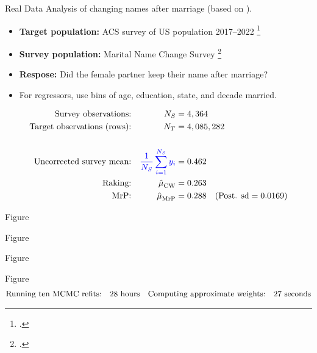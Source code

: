 
\begin{frame}{Real Data}
Analysis of changing names after marriage (based on \textcite{alexander:2019:namechange}).

\begin{itemize}
    \item \textbf{Target population:} ACS survey of US population 2017--2022 \footcite{ipumsusa}
    \item \textbf{Survey population:} Marital Name Change Survey \footcite{cohen:2019:namechange}
    \item \textbf{Respose:}  Did the female partner keep their name after marriage?
    \item For regressors, use bins of age, education, state, and decade married.
\end{itemize}

$$
\begin{aligned}
    \textrm{Survey observations:} &&  {N_S} ={}& 4,364  \\
    \textrm{Target observations (rows):} &&  {N_T} ={}& 4,085,282 \\
    \\
    \textrm{Uncorrected survey mean:} && \textcolor{blue}{\frac{1}{{N_S}} \sum_{i=1}^{N_S} y_i} ={}& 0.462 \\
    \textrm{Raking:} && \hat{\mu}^{}_{\mathrm{CW}} ={}& 0.263 \\
    \textrm{MrP:} && \hat{\mu}^{}_{\mathrm{MrP}} ={}& 0.288
        \quad(\textrm{Post. sd} = 0.0169)\\
\end{aligned}
$$
%
\end{frame}


\begin{frame}{Figure}
\AlexanderImbalancePrimary{}
\end{frame}


\begin{frame}{Figure}
\AlexanderImbalanceInteraction{}
\end{frame}




\begin{frame}[t]{Figure}
    \AlexanderPredictionFigOne{}
\end{frame}







\begin{frame}[t]{Figure}
    \AlexanderPredictionFigTwo{}
    \vspace{-3em}
    $$
    \begin{aligned}
        \textrm{Running ten MCMC refits:}\quad & 28 \textrm{ hours} &
        \textrm{Computing approximate weights:}\quad &27 \textrm{ seconds}\\
    \end{aligned}
    $$
\end{frame}


